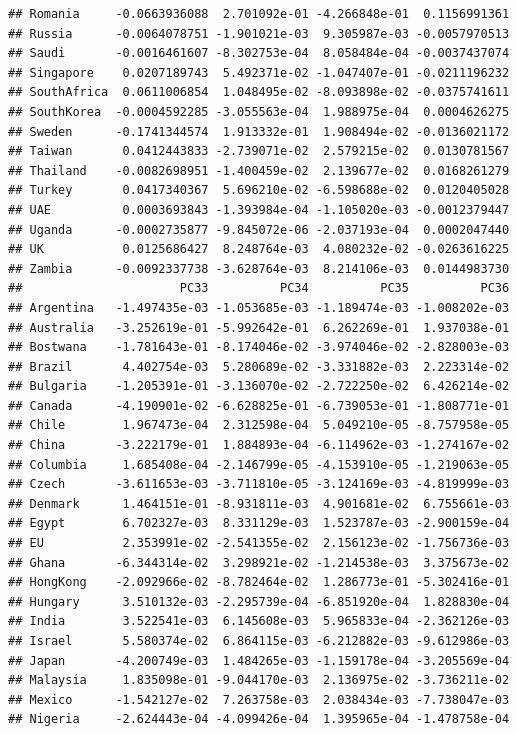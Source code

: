 \documentclass[11pt,preprint, authoryear]{elsarticle}
\numberwithin{equation}{section}
\numberwithin{figure}{section}
\numberwithin{table}{section}
\begin{document}
\begin{verbatim}
## Romania     -0.0663936088  2.701092e-01 -4.266848e-01  0.1156991361
## Russia      -0.0064078751 -1.901021e-03  9.305987e-03 -0.0057970513
## Saudi       -0.0016461607 -8.302753e-04  8.058484e-04 -0.0037437074
## Singapore    0.0207189743  5.492371e-02 -1.047407e-01 -0.0211196232
## SouthAfrica  0.0611006854  1.048495e-02 -8.093898e-02 -0.0375741611
## SouthKorea  -0.0004592285 -3.055563e-04  1.988975e-04  0.0004626275
## Sweden      -0.1741344574  1.913332e-01  1.908494e-02 -0.0136021172
## Taiwan       0.0412443833 -2.739071e-02  2.579215e-02  0.0130781567
## Thailand    -0.0082698951 -1.400459e-02  2.139677e-02  0.0168261279
## Turkey       0.0417340367  5.696210e-02 -6.598688e-02  0.0120405028
## UAE          0.0003693843 -1.393984e-04 -1.105020e-03 -0.0012379447
## Uganda      -0.0002735877 -9.845072e-06 -2.037193e-04  0.0002047440
## UK           0.0125686427  8.248764e-03  4.080232e-02 -0.0263616225
## Zambia      -0.0092337738 -3.628764e-03  8.214106e-03  0.0144983730
##                      PC33          PC34          PC35          PC36
## Argentina   -1.497435e-03 -1.053685e-03 -1.189474e-03 -1.008202e-03
## Australia   -3.252619e-01 -5.992642e-01  6.262269e-01  1.937038e-01
## Bostwana    -1.781643e-01 -8.174046e-02 -3.974046e-02 -2.828003e-03
## Brazil       4.402754e-03  5.280689e-02 -3.331882e-03  2.223314e-02
## Bulgaria    -1.205391e-01 -3.136070e-02 -2.722250e-02  6.426214e-02
## Canada      -4.190901e-02 -6.628825e-01 -6.739053e-01 -1.808771e-01
## Chile        1.967473e-04  2.312598e-04  5.049210e-05 -8.757958e-05
## China       -3.222179e-01  1.884893e-04 -6.114962e-03 -1.274167e-02
## Columbia     1.685408e-04 -2.146799e-05 -4.153910e-05 -1.219063e-05
## Czech       -3.611653e-03 -3.711810e-05 -3.124169e-03 -4.819999e-03
## Denmark      1.464151e-01 -8.931811e-03  4.901681e-02  6.755661e-03
## Egypt        6.702327e-03  8.331129e-03  1.523787e-03 -2.900159e-04
## EU           2.353991e-02 -2.541355e-02  2.156123e-02 -1.756736e-03
## Ghana       -6.344314e-02  3.298921e-02 -1.214538e-03  3.375673e-02
## HongKong    -2.092966e-02 -8.782464e-02  1.286773e-01 -5.302416e-01
## Hungary      3.510132e-03 -2.295739e-04 -6.851920e-04  1.828830e-04
## India        3.522541e-03  6.145608e-03  5.965833e-04 -2.362126e-03
## Israel       5.580374e-02  6.864115e-03 -6.212882e-03 -9.612986e-03
## Japan       -4.200749e-03  1.484265e-03 -1.159178e-04 -3.205569e-04
## Malaysia     1.835098e-01 -9.044170e-03  2.136975e-02 -3.736211e-02
## Mexico      -1.542127e-02  7.263758e-03  2.038434e-03 -7.738047e-03
## Nigeria     -2.624443e-04 -4.099426e-04  1.395965e-04 -1.478758e-04

\end{verbatim}
\end{document}
